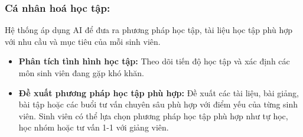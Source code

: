 \documentclass[a4paper, 15pt]{article}
\begin{document}
\subsubsection{Cá nhân hoá học tập:}
Hệ thống áp dụng AI để đưa ra phương pháp học tập, tài liệu học tập phù hợp với nhu cầu và mục tiêu của mỗi sinh viên.
\begin{itemize}
    \item \textbf{Phân tích tình hình học tập:}
    Theo dõi tiến độ học tập và xác định các môn sinh viên đang gặp khó khăn.

    \item \textbf{Đề xuất phương pháp học tập phù hợp:}
    Đề xuất các tài liệu, bài giảng, bài tập hoặc các buổi tư vấn chuyên sâu phù hợp với điểm yếu của từng sinh viên. Sinh viên có thể lựa chọn phương pháp học tập phù hợp như tự học, học nhóm hoặc tư vấn 1-1 với giảng viên.
\end{itemize}
\end{document}
